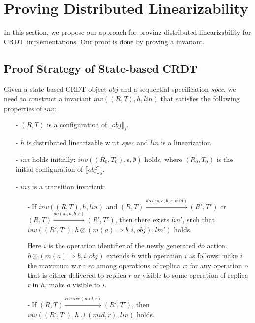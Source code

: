 
\section{Proving Distributed Linearizability}
\label{sec:proving distributed linearizability} 

In this section, we propose our approach for proving distributed linearizability for CRDT implementations. Our proof is done by proving a invariant. 


\subsection{Proof Strategy of State-based CRDT}
\label{subsec:proof strategy of operation-based CRDT} 

Given a state-based CRDT object $\mathit{obj}$ and a sequential specification $\mathit{spec}$, we need to construct a invariant $\mathit{inv}((R, T), h, \mathit{lin})$ that satisfies the following properties of $\mathit{inv}$:

\begin{itemize}
\setlength{\itemsep}{0.5pt}
\item[-] $(R, T)$ is a configuration of $\llbracket \mathit{obj} \rrbracket_s$.

\item[-] $h$ is distributed linearizable w.r.t $\mathit{spec}$ and $\mathit{lin}$ is a linearization. 

\item[-] $\mathit{inv}$ holds initially: $\mathit{inv}((R_0,T_0),\epsilon,\emptyset)$ holds, where $(R_0, T_0)$ is the initial configuration of $\llbracket \mathit{obj} \rrbracket_s$.

\item[-] $\mathit{inv}$ is a transition invariant:

    \begin{itemize}
    \setlength{\itemsep}{0.5pt}
    \item[-] If $\mathit{inv}((R, T), h, \mathit{lin})$ and $(R, T) {\xrightarrow{\mathit{do}(m, a, b, r, \mathit{mid})}} (R', T')$ or $(R, T) {\xrightarrow{\mathit{do}(m, a, b, r)}} (R', T')$, then there exists $\mathit{lin}'$, such that $\mathit{inv}((R', T'), h \otimes (m(a) \Rightarrow b, i, \mathit{obj}), \mathit{lin}')$ holds.

        Here $i$ is the operation identifier of the newly generated $\mathit{do}$ action. $h \otimes (m(a) \Rightarrow b,i,\mathit{obj})$ extends $h$ with operation $i$ as follows: make $i$ the maximum w.r.t $\mathit{ro}$ among operations of replica $r$; for any operation $o$ that is either delivered to replica $r$ or visible to some operation of replica $r$ in $h$, make $o$ visible to $i$. 

    \item[-] If $(R, T) {\xrightarrow{\mathit{receive}(\mathit{mid},r)}} (R', T')$, then $\mathit{inv}((R', T'),h \cup (\mathit{mid},r),\mathit{lin})$ holds.
    \end{itemize}
\end{itemize} 

